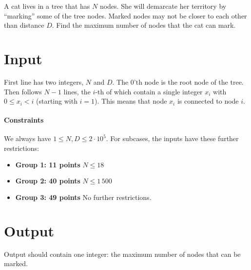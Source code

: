
A cat lives in a tree that has $N$ nodes. She will demarcate her territory by ``marking'' some of the tree nodes. Marked nodes may not be closer to each other than distance $D$. Find the maximum number of nodes that the cat can mark.
 
\section*{Input}
First line has two integers, $N$ and $D$. The $0$'th node is the root node of the tree. Then follows $N-1$ lines, the $i$-th of which contain a single integer $x_i$ with $0 \leq x_i < i$ (starting with $i = 1$). This means that node $x_i$ is connected to node $i$.
 


\paragraph{Constraints}
We always have $1 \leq N, D \leq 2 \cdot 10^5$. For subcases, the inputs have these further restrictions:
\begin{itemize}
    \item{\textbf{Group 1: 11 points}} $N \leq 18$
    \item{\textbf{Group 2: 40 points}} $N \leq 1\,500$
    \item{\textbf{Group 3: 49 points}} No further restrictions.
\end{itemize}

\section*{Output}
Output should contain one integer: the maximum number of nodes that can be marked.

